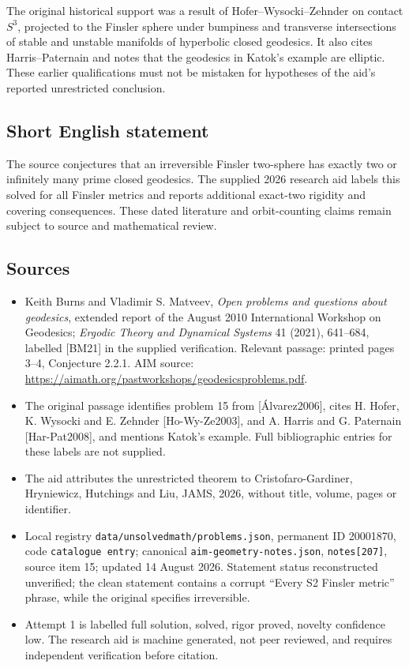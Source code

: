\documentclass[11pt]{article}
\begin{document}
The original historical support was a result of Hofer--Wysocki--Zehnder on contact \(S^3\), projected to the Finsler sphere under bumpiness and transverse intersections of stable and unstable manifolds of hyperbolic closed geodesics. It also cites Harris--Paternain and notes that the geodesics in Katok's example are elliptic. These earlier qualifications must not be mistaken for hypotheses of the aid's reported unrestricted conclusion.
\subsection{Short English statement}
The source conjectures that an irreversible Finsler two-sphere has exactly two or infinitely many prime closed geodesics. The supplied 2026 research aid labels this solved for all Finsler metrics and reports additional exact-two rigidity and covering consequences. These dated literature and orbit-counting claims remain subject to source and mathematical review.
\subsection{Sources}
\begin{itemize}
\item Keith Burns and Vladimir S. Matveev, \emph{Open problems and questions about geodesics}, extended report of the August 2010 International Workshop on Geodesics; \emph{Ergodic Theory and Dynamical Systems} 41 (2021), 641--684, labelled [BM21] in the supplied verification. Relevant passage: printed pages 3--4, Conjecture 2.2.1. AIM source: \url{https://aimath.org/pastworkshops/geodesicsproblems.pdf}.
\item The original passage identifies problem 15 from [\'Alvarez2006], cites H. Hofer, K. Wysocki and E. Zehnder [Ho-Wy-Ze2003], and A. Harris and G. Paternain [Har-Pat2008], and mentions Katok's example. Full bibliographic entries for these labels are not supplied.
\item The aid attributes the unrestricted theorem to Cristofaro-Gardiner, Hryniewicz, Hutchings and Liu, JAMS, 2026, without title, volume, pages or identifier.
\item Local registry \texttt{data/unsolvedmath/problems.json}, permanent ID 20001870, code \texttt{catalogue entry}; canonical \texttt{aim-geometry-notes.json}, \texttt{notes[207]}, source item 15; updated 14 August 2026. Statement status reconstructed unverified; the clean statement contains a corrupt ``Every S2 Finsler metric'' phrase, while the original specifies irreversible.
\item Attempt 1 is labelled full solution, solved, rigor proved, novelty confidence low. The research aid is machine generated, not peer reviewed, and requires independent verification before citation.
\end{itemize}
\end{document}

